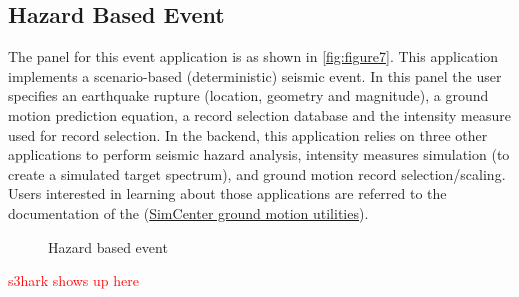 \subsection{Hazard Based Event}
The panel for this event application is as shown in \autoref{fig:figure7}. 
This application implements a scenario-based (deterministic) seismic event. 
In this panel the user specifies an earthquake rupture (location, geometry and magnitude), a ground motion prediction equation, 
a record selection database and the intensity measure used for record selection. 
In the backend, this application relies on three other applications to perform seismic hazard analysis, 
intensity measures simulation (to create a simulated target spectrum), and ground motion record selection/scaling. 
Users interested in learning about those applications are referred to the documentation of 
the (\href{https://github.com/NHERI-SimCenter/GroundMotionUtilities/blob/master/Readme.md}{SimCenter ground motion utilities}).
\begin{figure}[!htbp]
  \caption{Hazard based event}
  \label{fig:figure7}
\end{figure}

\textcolor{red}{s3hark shows up here}



